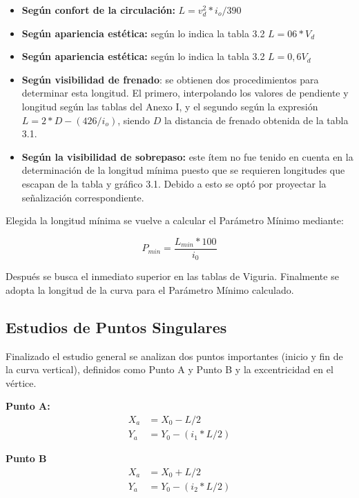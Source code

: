 \documentclass[../main.tex]{subfiles}
\begin{document}
\begin{itemize}
    \item \textbf{Según confort de la circulación:} $L=v_d^2*i_o/390$ 
    \item \textbf{Según apariencia estética:} según lo indica la tabla 3.2 $L=06*V_d$ 
    \item \textbf{Según apariencia estética:} según lo indica la tabla 3.2 $L=0,6 V_d$ 
    \item \textbf{Según visibilidad de frenado}: se obtienen dos procedimientos para determinar esta longitud. El primero, interpolando los valores de pendiente y longitud según las tablas del Anexo I, y el segundo según la expresión $L=2*D-(426/i_o)$, siendo $D$ la distancia de frenado obtenida de la tabla 3.1. 
    \item \textbf{Según la visibilidad de sobrepaso:} este ítem no fue tenido en cuenta en la determinación de la longitud mínima puesto que se requieren longitudes que escapan de la tabla y gráfico 3.1. Debido a esto se optó por proyectar la señalización correspondiente. 
\end{itemize}


Elegida la longitud mínima se vuelve a calcular el Parámetro Mínimo mediante:

\begin{equation}
P_{min}= \frac{L_{min}*100}{i_0}
\end{equation}

Después se busca el inmediato superior en las tablas de Viguria. Finalmente se adopta la longitud de la curva para el Parámetro Mínimo calculado. 


\subsection{Estudios de Puntos Singulares}

Finalizado el estudio general se analizan dos puntos importantes (inicio y fin de la curva vertical), definidos como Punto A y Punto B y la excentricidad en el vértice.

\textbf{Punto A:}
\begin{align}
X_a &= X_0 - L/2 \\
Y_a &= Y_0 - (i_1 * L/2)
\end{align}

\textbf{Punto B}
\begin{align}
X_a &= X_0 + L/2 \\
Y_a &= Y_0 - (i_2 * L/2)
\end{align}
\end{document}
